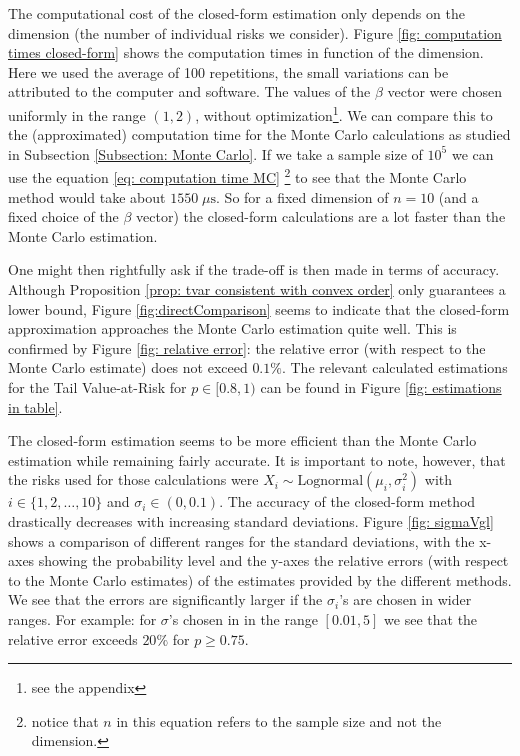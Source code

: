 \documentclass{article}
\begin{document}
The computational cost of the closed-form estimation only depends on the dimension (the number of individual risks we consider). Figure \ref{fig: computation times closed-form} shows the computation times in function of the dimension. Here we used the average of 100 repetitions, the small variations can be attributed to the computer and software. The values of the $\beta$ vector were chosen uniformly in the range $(1,2)$, without optimization\footnote{see the appendix}. We can compare this to the (approximated) computation time for the Monte Carlo calculations as studied in Subsection \ref{Subsection: Monte Carlo}. If we take a sample size of $10^5$ we can use the equation \eqref{eq: computation time MC} \footnote{notice that $n$ in this equation refers to the sample size and not the dimension.} to see that the Monte Carlo method would take about $1550 \; \mu\text{s}$.  So for a fixed dimension of $n = 10$ (and a fixed choice of the $\beta$ vector)  the closed-form calculations are a lot faster than the Monte Carlo estimation.


One might then rightfully ask if the trade-off is then made in terms of accuracy.  Although Proposition \ref{prop: tvar consistent with convex order} only guarantees a lower bound, Figure \ref{fig:directComparison} seems to indicate that the closed-form approximation approaches the Monte Carlo estimation quite well. This is confirmed by Figure \ref{fig: relative error}: the relative error (with respect to the Monte Carlo estimate) does not exceed $0.1\%$.  The relevant calculated estimations for the Tail Value-at-Risk for $p\in [0.8,1)$ can be found in Figure \ref{fig: estimations in table}. 


The closed-form estimation seems to be more efficient than the Monte Carlo estimation while remaining fairly accurate.  It is important to note, however, that the risks used for those calculations were $X_i \sim \text{Lognormal}(\mu_i,\sigma_i^2)$ with $i\in\{1,2,\dots,10\}$ and $\sigma_i\in (0,0.1)$. The accuracy of the closed-form method drastically decreases with increasing standard deviations. Figure \ref{fig: sigmaVgl} shows a comparison of different ranges for the standard deviations, with the x-axes showing the probability level and the y-axes the relative errors (with respect to the Monte Carlo estimates) of the estimates provided by the different methods. We see that the errors are significantly larger if the $\sigma_i$'s are chosen in wider ranges. For example: for $\sigma$'s chosen in in the range $[0.01,5]$ we see that the relative error exceeds $20\%$ for $p \geq 0.75$.
\end{document}
